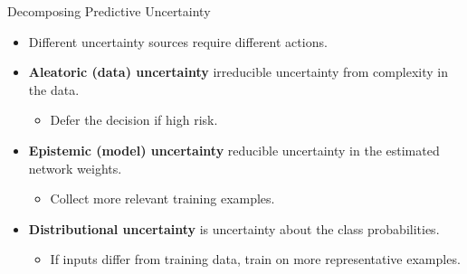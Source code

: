 \begin{frame}{Decomposing Predictive Uncertainty}
\label{frm:classification-motivation}
{\centering
\par}
\vspace{2mm}
\begin{itemize}
\setlength{\itemsep}{3mm}
\item Different uncertainty sources require different actions.
\item \textbf{Aleatoric (data) uncertainty} irreducible uncertainty from complexity in the data.
\par
\begin{itemize}
\setlength{\itemsep}{0pt}
\setlength{\topsep}{0pt}
\setlength{\partopsep}{0pt}
\item Defer the decision if high risk.
\end{itemize}
\item \textbf{Epistemic (model) uncertainty} reducible uncertainty in the estimated network weights. %
\par
\begin{itemize}
\setlength{\itemsep}{0pt}
\setlength{\topsep}{0pt}
\setlength{\partopsep}{0pt}
\item Collect more relevant training examples.
\end{itemize}
\item \textbf{Distributional uncertainty} is uncertainty about the class probabilities. %
\par
\begin{itemize}
\setlength{\itemsep}{0pt}
\setlength{\topsep}{0pt}
\setlength{\partopsep}{0pt}
\item If inputs differ from training data, train on more representative examples. %
\end{itemize}
\end{itemize}
\end{frame}

